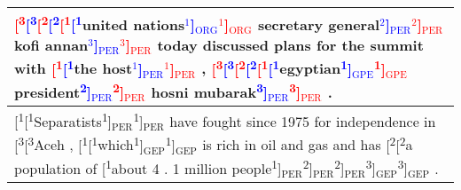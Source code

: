 \documentclass[11pt,a4paper]{article}
\begin{document}
\begin{table*}
\small
\centering
  \begin{tabular}{m{15.5cm}}
  \toprule
    \textcolor{red}{[\textsuperscript{3}}\textcolor{blue}{[\textsuperscript{3}}\textcolor{red}{[\textsuperscript{2}}\textcolor{blue}{[\textsuperscript{2}}\textcolor{red}{[\textsuperscript{1}}\textcolor{blue}{[\textsuperscript{1}}united nations\textcolor{blue}{$^1$]$_{\text{ORG}}$}\textcolor{red}{$^1$]$_{\text{ORG}}$} secretary general\textcolor{blue}{$^2$]$_{\text{PER}}$}\textcolor{red}{$^2$]$_{\text{PER}}$} kofi annan\textcolor{blue}{$^3$]$_{\text{PER}}$}\textcolor{red}{$^3$]$_{\text{PER}}$} today discussed plans for the summit with \textcolor{red}{[\textsuperscript{1}}\textcolor{blue}{[\textsuperscript{1}}the host\textcolor{blue}{$^1$]$_{\text{PER}}$}\textcolor{red}{$^1$]$_{\text{PER}}$} , \textcolor{red}{[\textsuperscript{3}}\textcolor{blue}{[\textsuperscript{3}}\textcolor{red}{[\textsuperscript{2}}\textcolor{blue}{[\textsuperscript{2}}\textcolor{red}{[\textsuperscript{1}}\textcolor{blue}{[\textsuperscript{1}}egyptian\textcolor{blue}{\textsuperscript{1}]$_{\text{GPE}}$}\textcolor{red}{\textsuperscript{1}]$_{\text{GPE}}$} president\textcolor{blue}{\textsuperscript{2}]$_{\text{PER}}$}\textcolor{red}{\textsuperscript{2}]$_{\text{PER}}$} hosni mubarak\textcolor{blue}{\textsuperscript{3}]$_{\text{PER}}$}\textcolor{red}{\textsuperscript{3}]$_{\text{PER}}$} .\\
\midrule
{\color{red}[\textsuperscript{1}}{\color{blue}[\textsuperscript{1}}Separatists{\color{blue}\textsuperscript{1}]$_{\text{PER}}$}{\color{red}\textsuperscript{1}]$_{\text{PER}}$} have fought since 1975 for independence in {\color{red}[\textsuperscript{3}}{\color{blue}[\textsuperscript{3}}Aceh , {\color{red}[\textsuperscript{1}}{\color{blue}[\textsuperscript{1}}which{\color{blue}\textsuperscript{1}]$_{\text{GEP}}$}{\color{red}\textsuperscript{1}]$_{\text{GEP}}$} is rich in oil and gas and has {\color{red}[\textsuperscript{2}}{\color{blue}[\textsuperscript{2}}a population of {\color{blue}[\textsuperscript{1}}about 4 . 1 million people{\color{blue}\textsuperscript{1}]$_{\text{PER}}$}{\color{blue}\textsuperscript{2}]$_{\text{PER}}$}{\color{red}\textsuperscript{2}]$_{\text{PER}}$}{\color{blue}\textsuperscript{3}]$_{\text{GEP}}$}{\color{red}\textsuperscript{3}]$_{\text{GEP}}$} .\\


\end{tabular}
\end{table*}
\end{document}
